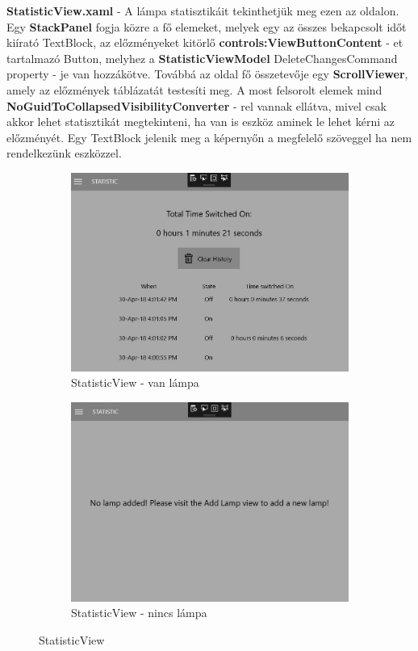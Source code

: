 \documentclass[a4paper,12pt]{report}
\begin{document}
    \textbf{StatisticView.xaml} - A lámpa statisztikáit tekinthetjük meg ezen az oldalon. Egy \textbf{StackPanel} fogja közre a fő
    elemeket, melyek egy az összes bekapcsolt időt kiírató TextBlock, az előzményeket kitörlő \textbf{controls:ViewButtonContent} - et tartalmazó
    Button, melyhez a \textbf{StatisticViewModel} DeleteChangesCommand property - je van hozzákötve. Továbbá az oldal fő összetevője egy \textbf{ScrollViewer},
    amely az előzmények táblázatát testesíti meg. A most felsorolt elemek mind \textbf{NoGuidToCollapsedVisibilityConverter} - rel vannak ellátva,
    mivel csak akkor lehet statisztikát megtekinteni, ha van is eszköz aminek le lehet kérni az előzményét. Egy TextBlock jelenik meg a képernyőn a megfelelő
    szöveggel ha nem rendelkezünk eszközzel.

\begin{figure}[H]
    \centering
    \begin{subfigure}[b]{0.4\linewidth}
        \includegraphics[width=\linewidth]{images/statisticview.jpg}
        \caption{StatisticView - van lámpa}
    \end{subfigure}
    \begin{subfigure}[b]{0.4\linewidth}
        \includegraphics[width=\linewidth]{images/statisticnolamp.jpg}
        \caption{StatisticView - nincs lámpa}
    \end{subfigure}
    \caption{StatisticView}
    \label{fig:StatisticView}
\end{figure}
\end{document}
